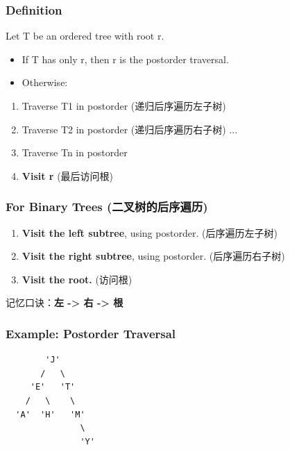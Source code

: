 \documentclass[10pt,a4paper,openany]{ctexbook}
\theoremstyle{definition}
\theoremstyle{remark}
\renewenvironment{quote}
  {\list{}{\leftmargin=1em\rightmargin=0pt\topsep=0.5pt\partopsep=0pt}\item[]}
  {\endlist}
\begin{document}
\subsubsection{Definition}

Let T be an ordered tree with root r.
\begin{itemize}
\item If T has only r, then r is the postorder traversal.
\item Otherwise:
\end{itemize}

\begin{enumerate}
\item Traverse T1 in postorder (递归后序遍历左子树)
\item Traverse T2 in postorder (递归后序遍历右子树)
...

\item Traverse Tn in postorder
\item \textbf{Visit r} (最后访问根)

\end{enumerate}

\subsubsection{For Binary Trees (二叉树的后序遍历)}

\begin{enumerate}
\item \textbf{Visit the left subtree}, using postorder. (后序遍历左子树)
\item \textbf{Visit the right subtree}, using postorder. (后序遍历右子树)
\item \textbf{Visit the root.} (访问根)

\end{enumerate}

\begin{quote}
记忆口诀：\textbf{左 -> 右 -> 根}

\end{quote}

\subsubsection{Example: Postorder Traversal}

{\footnotesize\begin{verbatim}
        'J'
       /   \
     'E'   'T'
    /   \    \
  'A'  'H'   'M'
               \
               'Y'
\end{verbatim}}
\end{document}
